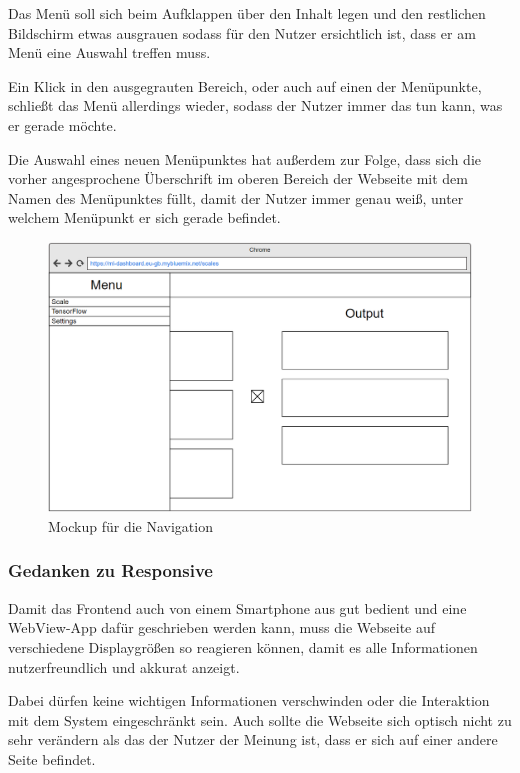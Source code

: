 Das Menü soll sich beim Aufklappen über den Inhalt legen und den restlichen Bildschirm etwas ausgrauen sodass für den
Nutzer ersichtlich ist, dass er am Menü eine Auswahl treffen muss.

Ein Klick in den ausgegrauten Bereich, oder auch auf einen der Menüpunkte, schließt das Menü allerdings wieder, sodass
der Nutzer immer das tun kann, was er gerade möchte.

Die Auswahl eines neuen Menüpunktes hat außerdem zur Folge, dass sich die vorher angesprochene Überschrift im oberen
Bereich der Webseite mit dem Namen des Menüpunktes füllt, damit der Nutzer immer genau weiß, unter welchem Menüpunkt
er sich gerade befindet.

\begin{figure}[h]
    \centering
    \includegraphics[width=\textwidth]{images/kapitel_4/mockup_scale_menu.png}
    \caption{Mockup für die Navigation}
    \label{fig:umsetzung_mockup_scale_menu}
\end{figure}

\subsubsection{Gedanken zu Responsive}
Damit das Frontend auch von einem Smartphone aus gut bedient und eine WebView-App dafür geschrieben werden kann, muss
die Webseite auf verschiedene Displaygrößen so reagieren können, damit es alle Informationen nutzerfreundlich und
akkurat anzeigt.

Dabei dürfen keine wichtigen Informationen verschwinden oder die Interaktion mit dem System eingeschränkt sein. Auch
sollte die Webseite sich optisch nicht zu sehr verändern als das der Nutzer der Meinung ist, dass er sich auf einer
andere Seite befindet.

